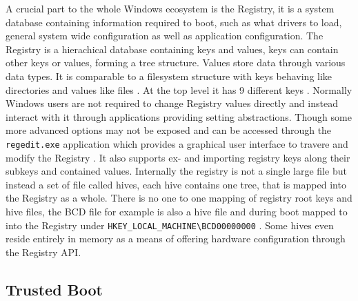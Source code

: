 A crucial part to the whole Windows ecosystem is the Registry, it is a system database containing information required to boot, such as what drivers to load, general system wide configuration as well as application configuration.
\cite[1. Registry]{windows-internals-7-part1}
The Registry is a hierachical database containing keys and values, keys can contain other keys or values, forming a tree structure. Values store data through various data types.
It is comparable to a filesystem structure with keys behaving like directories and values like files \cite[10. The registry - Registry data types]{windows-internals-7-part2}. At the top level it has 9 different keys \cite[10. The registry - Registry logical structure]{windows-internals-7-part2}. Normally Windows users are not required to change Registry values directly and instead interact with it through applications providing setting abstractions. Though some more advanced options may not be exposed and can be accessed through the \lstinline{regedit.exe} application which provides a graphical user interface to travere and modify the Registry \cite[10. The registry - Viewing and changing the registry]{windows-internals-7-part2}. It also supports ex- and importing registry keys along their subkeys and contained values. Internally the registry is not a single large file but instead a set of file called hives, each hive contains one tree, that is mapped into the Registry as a whole. There is no one to one mapping of registry root keys and hive files, the \ac{BCD} file for example is also a hive file and during boot mapped to into the Registry under \lstinline{HKEY_LOCAL_MACHINE\BCD00000000} \cite[10. The registry - Registry logical structure]{windows-internals-7-part2}. Some hives even reside entirely in memory as a means of offering hardware configuration through the Registry \ac{API}.




\subsection{Trusted Boot}
